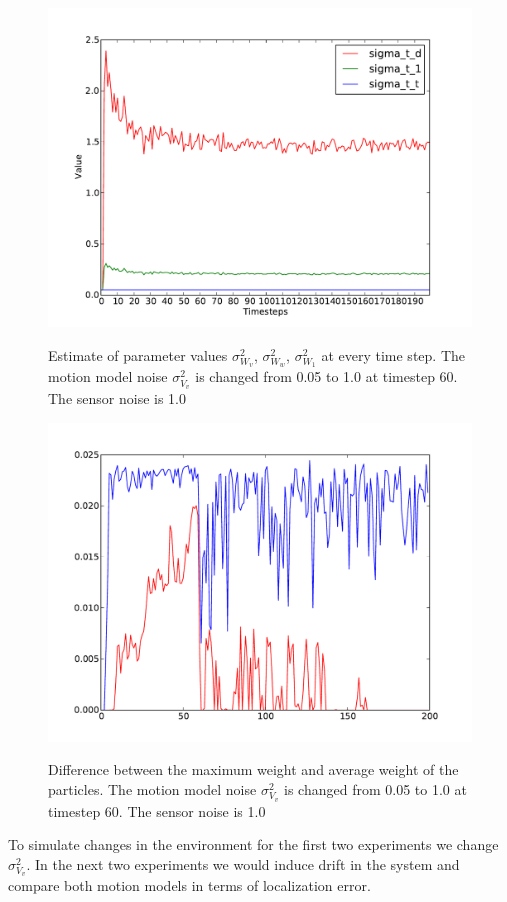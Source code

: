 \documentclass[12pt]{dalcsthesis}
\begin{document}
\begin{figure}
  \centering
     {\includegraphics[height = 3.0 in]{./plots/200_005_10_s_10_motion_model_rotation.pdf}}
  \caption{\label{fig-varying_sensor_noise_motion_model_1.0_rotation}Estimate of parameter values $\sigma_{W_{v}}^{2}$, $\sigma_{W_{w}}^{2}$, $\sigma_{W_{1}}^{2}$ at every time step. The motion model noise $\sigma_{V_{v}}^{2}$ is changed from 0.05 to 1.0 at timestep 60. The sensor noise is 1.0 }
\end{figure}

\begin{figure}
  \centering
     {\includegraphics[height = 3.0 in]{./plots/200_005_10_s_10_max_weight.pdf}}
  \caption{\label{fig-varying_sensor_noise_sensor_model_1.0_max_weight} Difference between the maximum weight and average weight of the particles. The motion model noise $\sigma_{V_{v}}^{2}$ is changed from 0.05 to 1.0 at timestep 60. The sensor noise is 1.0}
\end{figure}

To simulate changes in the environment for the first two experiments we change $\sigma_{V_{v}}^2$. In the next two experiments we would induce drift in the system and compare both motion models in terms of localization error.
\end{document}
